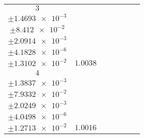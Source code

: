 \documentclass[8pt]{article}
\begin{document}
\begin{longtable}[l]{c c c c c c c}
$\num{3}$ & \begin{tabular}[c]{@{}c@{}}$\num{1.0023}$ \\ $\pm\num{1.4693e-3}$\end{tabular} & \begin{tabular}[c]{@{}c@{}}$\num{5.367e-2}$ \\ $\pm\num{8.412e-2}$\end{tabular} & \begin{tabular}[c]{@{}c@{}}$\num{1.8558e+3}$ \\ $\pm\num{2.0914e-3}$\end{tabular} & \begin{tabular}[c]{@{}c@{}}$\num{3.7116}$ \\ $\pm\num{4.1828e-6}$\end{tabular} & \begin{tabular}[c]{@{}c@{}}$\num{7.0212}$ \\ $\pm\num{1.3102e-2}$\end{tabular} & $\num{1.0038}$\\
$\num{4}$ & \begin{tabular}[c]{@{}c@{}}$\num{0.99981}$ \\ $\pm\num{1.3837e-3}$\end{tabular} & \begin{tabular}[c]{@{}c@{}}$\num{4.9889e-2}$ \\ $\pm\num{7.9332e-2}$\end{tabular} & \begin{tabular}[c]{@{}c@{}}$\num{1.8644e+3}$ \\ $\pm\num{2.0249e-3}$\end{tabular} & \begin{tabular}[c]{@{}c@{}}$\num{3.7288}$ \\ $\pm\num{4.0498e-6}$\end{tabular} & \begin{tabular}[c]{@{}c@{}}$\num{7.0057}$ \\ $\pm\num{1.2713e-2}$\end{tabular} & $\num{1.0016}$\\
\bottomrule
\end{longtable}
\end{document}
